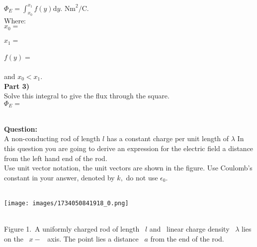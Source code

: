 \documentclass[addpoints,12pt, margin-left=35px]{exam}
\begin{document}
$\Phi_E = \int_{x_0}^{x_1} f ( y ) \mathrm{d} y. \text{ Nm}^2 \text{/C.}$\\

Where:\\

$x_0 = $  \underline{\hspace{3cm}}  \\

\\

$x_1 = $  \underline{\hspace{3cm}}  \\

\\

$ f ( y ) = $  \underline{\hspace{3cm}}  \\

\\

and $x_0 < x_1.$\\

\textbf{Part 3)}\\

Solve this integral to give the flux through the square.\\

$ \Phi_E = $  \underline{\hspace{3cm}}  \\

\\

\newpage

\textbf{Question:}\\

A non-conducting rod of length $l $ has a constant charge per unit length of $\lambda $ In this question you are going to derive an expression for the electric field a distance from the left hand end of the rod.\\

Use unit vector notation, the unit vectors are shown in the figure. Use Coulomb's constant in your answer, denoted by $k,$ do not use $\epsilon_0.$\\

 \\

\begin{center}
\texttt{[image: images/1734050841918\_0.png]}
\end{center}\\

Figure 1. A uniformly charged rod of length  $ l $ and  linear charge density  $ \lambda$ lies on the  $ x- $  axis. The point lies a distance  $ a$ from the end of the rod.\\
\end{document}
